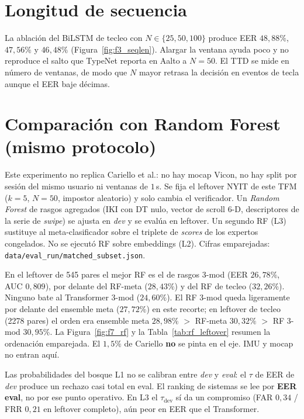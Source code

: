 \section{Longitud de secuencia}

La ablación del BiLSTM de tecleo con $N\in\{25,50,100\}$ produce EER $48{,}88\%$, $47{,}56\%$ y 
$46{,}48\%$ (Figura~\ref{fig:f3_seqlen}). Alargar la ventana ayuda poco y no reproduce el salto que 
TypeNet reporta en Aalto a $N=50$. El TTD se mide en número de ventanas, de modo que $N$ mayor retrasa 
la decisión en eventos de tecla aunque el EER baje décimas.

\section{Comparación con Random Forest (mismo protocolo)}

Este experimento no replica Cariello et al.: no hay mocap Vicon, no hay split por sesión del mismo usuario ni ventanas de $1$\,s. Se fija el leftover NYIT de este TFM ($k=5$, $N=50$, impostor aleatorio) y solo cambia el verificador. Un \textit{Random Forest} de rasgos agregados (IKI con DT nulo, vector de scroll $6$-D, descriptores de la serie de \textit{swipe}) se ajusta en \textit{dev} y se evalúa en leftover. Un segundo RF (L3) sustituye al meta-clasificador sobre el triplete de \textit{scores} de los expertos congelados. No se ejecutó RF sobre embeddings (L2). Cifras emparejadas: \texttt{data/eval\_run/matched\_subset.json}.

En el leftover de 545 pares el mejor RF es el de rasgos 3-mod (EER $26{,}78\%$, AUC $0{,}809$), por delante del RF-meta ($28{,}43\%$) y del RF de tecleo ($32{,}26\%$). Ninguno bate al Transformer 3-mod ($24{,}60\%$). El RF 3-mod queda ligeramente por delante del ensemble meta ($27{,}72\%$) en este recorte; en leftover de tecleo (2278 pares) el orden era ensemble meta $28{,}98\%$ $>$ RF-meta $30{,}32\%$ $>$ RF 3-mod $30{,}95\%$. La Figura~\ref{fig:f7_rf} y la Tabla~\ref{tab:rf_leftover} resumen la ordenación emparejada. El $1{,}5\%$ de Cariello \textbf{no} se pinta en el eje. IMU y mocap no entran aquí.

Las probabilidades del bosque L1 no se calibran entre \textit{dev} y \textit{eval}: el $\tau$ de EER de \textit{dev} produce un rechazo casi total en eval. El ranking de sistemas se lee por \textbf{EER eval}, no por ese punto operativo. En L3 el $\tau_{\mathrm{dev}}$ sí da un compromiso (FAR $0{,}34$ / FRR $0{,}21$ en leftover completo), aún peor en EER que el Transformer.

